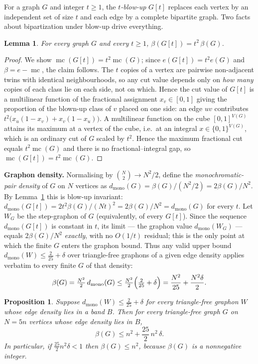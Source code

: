 \documentclass[11pt]{article}
\newtheorem{lemma}[theorem]{Lemma}
\newtheorem{proposition}[theorem]{Proposition}
\theoremstyle{remark}
\DeclareMathOperator{\mc}{mc}
\newcommand{\bip}{\beta}
\newcommand{\dmono}{d_{\mathrm{mono}}}
\begin{document}
For a graph $G$ and integer $t\ge 1$, the \emph{$t$-blow-up} $G[t]$ replaces each
vertex by an independent set of size $t$ and each edge by a complete bipartite
graph. Two facts about bipartization under blow-up drive everything.

\begin{lemma}\label{lem:blowup}
For every graph $G$ and every $t\ge 1$, $\bip(G[t])=t^2\,\bip(G)$.
\end{lemma}

\begin{proof}
We show $\mc(G[t])=t^2\mc(G)$; since $e(G[t])=t^2 e(G)$ and
$\bip=e-\mc$, the claim follows. The $t$ copies of a vertex are pairwise
non-adjacent twins with identical neighbourhoods, so any cut value depends only on
\emph{how many} copies of each class lie on each side, not on which. Hence the cut
value of $G[t]$ is a multilinear function of the fractional assignment
$x_v\in[0,1]$ giving the proportion of the blown-up class of $v$ placed on one
side: an edge $uv$ contributes
$t^2\bigl(x_u(1-x_v)+x_v(1-x_u)\bigr)$. A multilinear function on the cube
$[0,1]^{V(G)}$ attains its maximum at a vertex of the cube, i.e.\ at an integral
$x\in\{0,1\}^{V(G)}$, which is an ordinary cut of $G$ scaled by $t^2$. Hence the
maximum fractional cut equals $t^2\mc(G)$ and there is no fractional--integral
gap, so $\mc(G[t])=t^2\mc(G)$.
\end{proof}

\noindent\textbf{Graphon density.} Normalising by $\binom{N}{2}\to N^2/2$, define
the \emph{monochromatic-pair density} of $G$ on $N$ vertices as
$\dmono(G)=\bip(G)/(N^2/2)=2\bip(G)/N^2$. By Lemma~\ref{lem:blowup} this is
blow-up invariant: $\dmono(G[t])=2t^2\bip(G)/(Nt)^2=2\bip(G)/N^2=\dmono(G)$ for
every $t$. Let $W_G$ be the step-graphon of $G$ (equivalently, of every $G[t]$).
Since the sequence $\dmono(G[t])$ is constant in $t$, its limit --- the graphon
value $\dmono(W_G)$ --- equals $2\bip(G)/N^2$ \emph{exactly}, with no $O(1/t)$
residual; this is the only point at which the finite $G$ enters the graphon bound.
Thus any valid upper bound
$\dmono(W)\le \tfrac{2}{25}+\delta$ over triangle-free graphons of a given edge
density applies verbatim to every finite $G$ of that density:
\begin{equation}\label{eq:transfer}
\bip(G)=\tfrac{N^2}{2}\,\dmono(G)\le \tfrac{N^2}{2}\Bigl(\tfrac{2}{25}+\delta\Bigr)
=\frac{N^2}{25}+\frac{N^2\delta}{2}.
\end{equation}

\begin{proposition}\label{prop:integrality}
Suppose $\dmono(W)\le \tfrac{2}{25}+\delta$ for every triangle-free graphon $W$
whose edge density lies in a band $B$. Then for every triangle-free graph $G$ on
$N=5n$ vertices whose edge density lies in $B$,
\[
\bip(G)\le n^2+\frac{25}{2}\,n^2\,\delta.
\]
In particular, if $\tfrac{25}{2}n^2\delta<1$ then $\bip(G)\le n^2$, because
$\bip(G)$ is a nonnegative integer.
\end{proposition}
\end{document}
